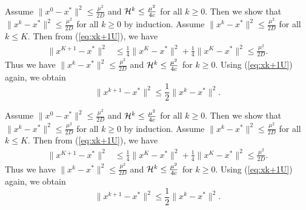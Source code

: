 \documentclass[11pt]{article}
\begin{document}
	Assume $\|x^0-x^*\|^2 \leq \frac{\mu^2}{2D}$ and ${\cal H}^k \leq \frac{\mu^2}{4c}$ for all $k\geq 0$. Then we show that $\|x^k-x^*\|^2 \leq \frac{\mu^2}{2D}$ for all $k\geq 0$ by induction. Assume  $\|x^k-x^*\|^2 \leq \frac{\mu^2}{2D}$ for all $k \leq K$. Then from (\ref{eq:xk+1U}), we have 
	\begin{align*}
		\|x^{K+1} - x^*\|^2 & \leq \frac{1}{4}\|x^K-x^*\|^2 + \frac{1}{4}\|x^K-x^*\|^2 \leq \frac{\mu^2}{2D}. 
	\end{align*} 
	Thus we have $\|x^k-x^*\|^2 \leq \frac{\mu^2}{2D}$ and ${\cal H}^k \leq \frac{\mu^2}{4c}$ for $k\geq 0$. Using (\ref{eq:xk+1U}) again, we obtain 
	\begin{equation}\label{eq:xk+1Ufix}
		\|x^{k+1} - x^*\|^2 \leq \frac{1}{2} \|x^k-x^*\|^2. 
	\end{equation}
	
	Assume $\|x^0-x^*\|^2 \leq \frac{\mu^2}{2D}$ and ${\cal H}^k \leq \frac{\mu^2}{4c}$ for all $k\geq 0$. Then we show that $\|x^k-x^*\|^2 \leq \frac{\mu^2}{2D}$ for all $k\geq 0$ by induction. Assume  $\|x^k-x^*\|^2 \leq \frac{\mu^2}{2D}$ for all $k \leq K$. Then from (\ref{eq:xk+1U}), we have 
	\begin{align*}
		\|x^{K+1} - x^*\|^2 & \leq \frac{1}{4}\|x^K-x^*\|^2 + \frac{1}{4}\|x^K-x^*\|^2 \leq \frac{\mu^2}{2D}. 
	\end{align*} 
	Thus we have $\|x^k-x^*\|^2 \leq \frac{\mu^2}{2D}$ and ${\cal H}^k \leq \frac{\mu^2}{4c}$ for $k\geq 0$. Using (\ref{eq:xk+1U}) again, we obtain 
	\begin{equation}\label{eq:xk+1Ufix}
		\|x^{k+1} - x^*\|^2 \leq \frac{1}{2} \|x^k-x^*\|^2. 
	\end{equation}
	
\end{document}
